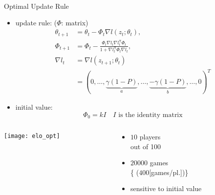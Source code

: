 \documentclass[fleqn,aspectratio=1610]{beamer}
\begin{document}
\begin{frame}[label={sec:org8a23739}]{Optimal Update Rule}
\begin{itemize}
\item update rule: (\(\varPhi\): matrix)
\begin{align}
  \theta_{t+1}
  &=\theta_{t}-\varPhi_{t}\nabla l(z_{t};\theta_{t}),\\
  \varPhi_{t+1}
  &=
    \varPhi_{t}
    -\frac{\varPhi_{t}\nabla l_{t}\nabla l_{t}^{\mathsf{T}}\varPhi_{t}}
    {1+\nabla l_{t}^{\mathsf{T}}\varPhi_{t}\nabla l_{t}},\\
  \nabla l_{t}
  &=\nabla l(z_{t+1};\theta_{t})\\	 
  &=(0,\dotsc,\underbrace{\gamma(1-P)}_{a},\dotsc,
    \underbrace{-\gamma(1-P)}_{b},\dotsc,0)^{T}
\end{align}
\item initial value:
\begin{equation}
  \varPhi_{0}=k I\quad \text{\(I\) is the identity matrix}
\end{equation}
\end{itemize}
\end{frame}

\begin{frame}[label={sec:org1c99c5d}]{}
\begin{columns}
\begin{column}{0.65\columnwidth}
\begin{center}
  \texttt{[image: elo\_opt]}%
\end{center}
\end{column}
\begin{column}{0.35\columnwidth}
\begin{itemize}
\item \(10\) players\\[0pt]
out of 100
\item \(20000\) games\\[0pt]
\{\small
  (\(400\)[games/pl.])\}
\item sensitive to initial value
\end{itemize}
\end{column}
\end{columns}
\end{frame}
\end{document}
